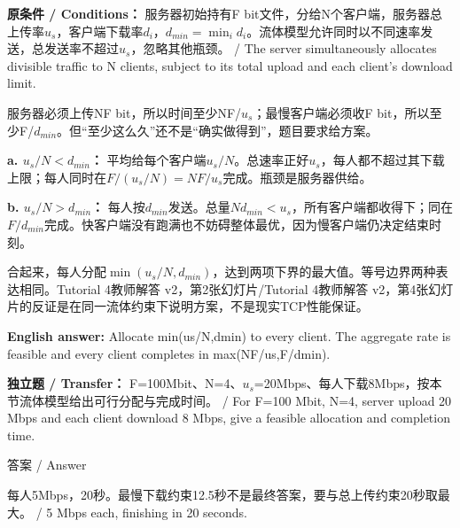 

\textbf{原条件 / Conditions：} 服务器初始持有F bit文件，分给N个客户端，服务器总上传率\(u_s\)，客户端下载率\(d_i\)，\(d_{min}=\min_i d_i\)。流体模型允许同时以不同速率发送，总发送率不超过\(u_s\)，忽略其他瓶颈。 / The server simultaneously allocates divisible traffic to N clients, subject to its total upload and each client's download limit.


服务器必须上传NF bit，所以时间至少NF/\(u_s\)；最慢客户端必须收F bit，所以至少F/\(d_{min}\)。但“至少这么久”还不是“确实做得到”，题目要求给方案。


\textbf{a. \(u_s/N\lt d_{min}\)：} 平均给每个客户端\(u_s/N\)。总速率正好\(u_s\)，每人都不超过其下载上限；每人同时在\(F/(u_s/N)=NF/u_s\)完成。瓶颈是服务器供给。


\textbf{b. \(u_s/N>d_{min}\)：} 每人按\(d_{min}\)发送。总量\(Nd_{min}\lt u_s\)，所有客户端都收得下；同在\(F/d_{min}\)完成。快客户端没有跑满也不妨碍整体最优，因为慢客户端仍决定结束时刻。


合起来，每人分配\(\min(u_s/N,d_{min})\)，达到两项下界的最大值。等号边界两种表达相同。Tutorial 4教师解答 v2，第2张幻灯片/Tutorial 4教师解答 v2，第4张幻灯片的反证是在同一流体约束下说明方案，不是现实TCP性能保证。


\textbf{English answer:} Allocate min(us/N,dmin) to every client. The aggregate rate is feasible and every client completes in max(NF/us,F/dmin).


\textbf{独立题 / Transfer：} F=100Mbit、N=4、\(u_s\)=20Mbps、每人下载8Mbps，按本节流体模型给出可行分配与完成时间。 / For F=100 Mbit, N=4, server upload 20 Mbps and each client download 8 Mbps, give a feasible allocation and completion time.



\begin{StudySolution}{答案 / Answer}


每人5Mbps，20秒。最慢下载约束12.5秒不是最终答案，要与总上传约束20秒取最大。 / 5 Mbps each, finishing in 20 seconds.


\end{StudySolution}








